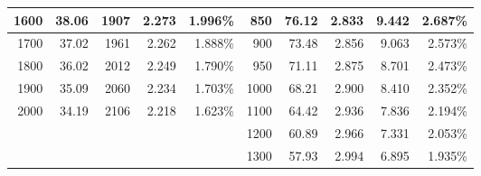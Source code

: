 \documentclass{article}
\begin{document}
\begin{table}[t]
\begin{tabular}{rrrrr|r|r|r|r|r|}
        \hline
        \multicolumn{1}{|r|}{1600}        & \multicolumn{1}{r|}{38.06}           & \multicolumn{1}{r|}{1907}  & \multicolumn{1}{r|}{2.273 } & 1.996\%                   & 850                     & 76.12                     & 2.833                     & 9.442                     & 2.687\% \bigstrut                   \\
        \hline
        \multicolumn{1}{|r|}{1700}        & \multicolumn{1}{r|}{37.02}           & \multicolumn{1}{r|}{1961}  & \multicolumn{1}{r|}{2.262 } & 1.888\%                   & 900                     & 73.48                     & 2.856                     & 9.063                     & 2.573\% \bigstrut                   \\
        \hline
        \multicolumn{1}{|r|}{1800}        & \multicolumn{1}{r|}{36.02}           & \multicolumn{1}{r|}{2012}  & \multicolumn{1}{r|}{2.249 } & 1.790\%                   & 950                     & 71.11                     & 2.875                     & 8.701                     & 2.473\% \bigstrut                   \\
        \hline
        \multicolumn{1}{|r|}{1900}        & \multicolumn{1}{r|}{35.09}           & \multicolumn{1}{r|}{2060}  & \multicolumn{1}{r|}{2.234 } & 1.703\%                   & 1000                    & 68.21                     & 2.900                     & 8.410                     & 2.352\% \bigstrut                   \\
        \hline
        \multicolumn{1}{|r|}{2000}        & \multicolumn{1}{r|}{34.19}           & \multicolumn{1}{r|}{2106}  & \multicolumn{1}{r|}{2.218 } & 1.623\%                   & 1100                    & 64.42                     & 2.936                     & 7.836                     & 2.194\% \bigstrut                   \\
        \hline
                                          &                                      &                            &                             &                           & 1200                    & 60.89                     & 2.966                     & 7.331                     & 2.053\% \bigstrut                   \\
        \cline{6-10}                      &                                      &                            &                             &                           & 1300                    & 57.93                     & 2.994                     & 6.895                     & 1.935\% \bigstrut                   \\

\end{tabular}
\end{table}
\end{document}
